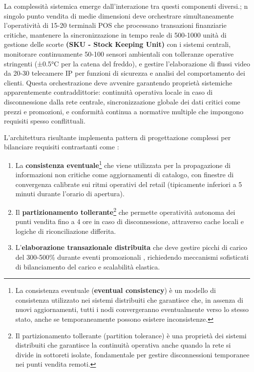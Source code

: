 La complessità sistemica emerge dall'interazione tra questi componenti diversi.; n singolo punto vendita di medie dimensioni deve orchestrare simultaneamente l'operatività di 15-20 terminali POS che processano transazioni finanziarie critiche, mantenere la sincronizzazione in tempo reale di 500-1000 unità di gestione delle scorte \textbf{(SKU - Stock Keeping Unit)} con i sistemi centrali, monitorare continuamente 50-100 sensori ambientali con tolleranze operative stringenti (±0.5°C per la catena del freddo), e gestire l'elaborazione di flussi video da 20-30 telecamere IP per funzioni di sicurezza e analisi del comportamento dei clienti. Questa orchestrazione deve avvenire garantendo proprietà sistemiche apparentemente contraddittorie: continuità operativa locale in caso di disconnessione dalla rete centrale, sincronizzazione globale dei dati critici come prezzi e promozioni, e conformità continua a normative multiple che impongono requisiti spesso conflittuali.

L'architettura risultante implementa pattern di progettazione complessi per bilanciare requisiti contrastanti come :
\begin{enumerate}
    \item La \textbf{consistenza eventuale}\footnote{La consistenza eventuale (\textbf{eventual consistency}) è un modello di consistenza utilizzato nei sistemi distribuiti che garantisce che, in assenza di nuovi aggiornamenti, tutti i nodi convergeranno eventualmente verso lo stesso stato, anche se temporaneamente possono esistere inconsistenze.} che viene utilizzata per la propagazione di informazioni non critiche come aggiornamenti di catalogo, con finestre di convergenza calibrate sui ritmi operativi del retail (tipicamente inferiori a 5 minuti durante l'orario di apertura).
    \item Il \textbf{partizionamento tollerante}\footnote{Il partizionamento tollerante (partition tolerance) è una proprietà dei sistemi distribuiti che garantisce la continuità operativa anche quando la rete si divide in sottoreti isolate, fondamentale per gestire disconnessioni temporanee nei punti vendita remoti.} che permette operatività autonoma dei punti vendita fino a 4 ore in caso di disconnessione, attraverso cache locali e logiche di riconciliazione differita.
    \item L'\textbf{elaborazione transazionale distribuita} che deve gestire picchi di carico del 300-500\% durante eventi promozionali \autocite{Osservatorio2024}, richiedendo meccanismi sofisticati di bilanciamento del carico e scalabilità elastica.
\end{enumerate}

